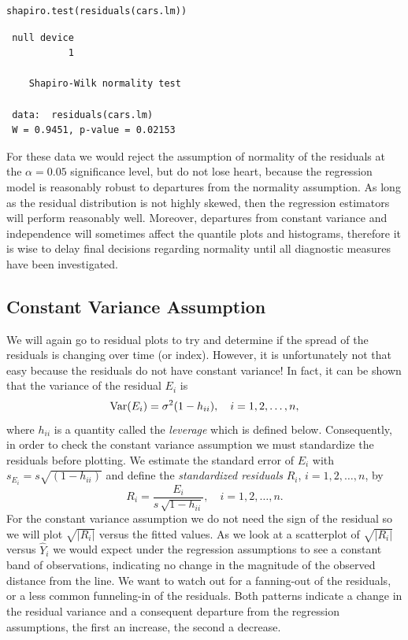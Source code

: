 \documentclass[captions=tableheading]{scrbook}
\begin{document}
\begin{verbatim}
shapiro.test(residuals(cars.lm))
\end{verbatim}

\begin{verbatim}
 null device 
           1
  
 	Shapiro-Wilk normality test
 
 data:  residuals(cars.lm) 
 W = 0.9451, p-value = 0.02153
\end{verbatim}

For these data we would reject the assumption of normality of the residuals at the \(\alpha=0.05\) significance level, but do not lose heart, because the regression model is reasonably robust to departures from the normality assumption. As long as the residual distribution is not highly skewed, then the regression estimators will perform reasonably well. Moreover, departures from constant variance and independence will sometimes affect the quantile plots and histograms, therefore it is wise to delay final decisions regarding normality until all diagnostic measures have been investigated.
\subsection{Constant Variance Assumption}
\label{sec-11-4-2}

\label{sub:Constant-Variance-Assumption}

We will again go to residual plots to try and determine if the spread of the residuals is changing over time (or index). However, it is unfortunately not that easy because the residuals do not have constant variance! In fact, it can be shown that the variance of the residual \(E_{i}\) is 
\begin{equation}
\mbox{Var\ensuremath{(E_{i})}}=\sigma^{2}(1-h_{ii}),\quad i=1,2,\ldots,n,
\end{equation}
where \(h_{ii}\) is a quantity called the \emph{leverage} which is defined below. Consequently, in order to check the constant variance assumption we must standardize the residuals before plotting. We estimate the standard error of \(E_{i}\) with \(s_{E_{i}}=s\sqrt{(1-h_{ii})}\) and define the \emph{standardized residuals} \(R_{i}\), \(i=1,2,\ldots,n\), by 
\begin{equation} 
R_{i}=\frac{E_{i}}{s\,\sqrt{1-h_{ii}}},\quad i=1,2,\ldots,n.
\end{equation}
For the constant variance assumption we do not need the sign of the residual so we will plot \(\sqrt{|R_{i}|}\) versus the fitted values. As we look at a scatterplot of \(\sqrt{|R_{i}|}\) versus \(\hat{Y}_{i}\) we would expect under the regression assumptions to see a constant band of observations, indicating no change in the magnitude of the observed distance from the line. We want to watch out for a fanning-out of the residuals, or a less common funneling-in of the residuals. Both patterns indicate a change in the residual variance and a consequent departure from the regression assumptions, the first an increase, the second a decrease.
\end{document}
